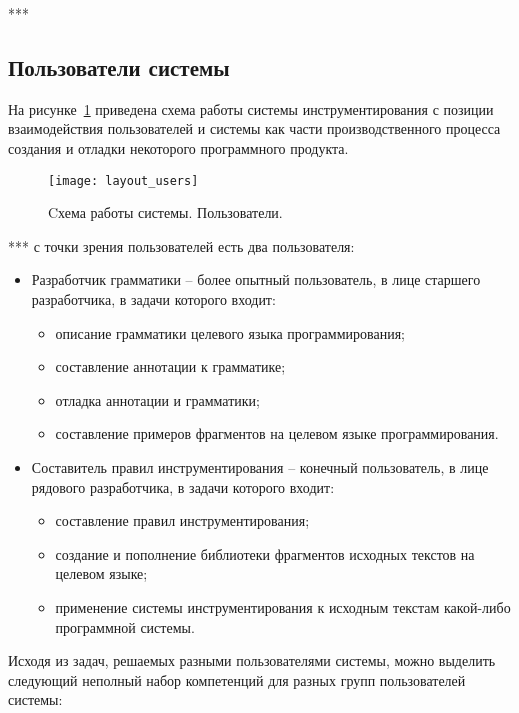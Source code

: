 ***

\subsection{Пользователи системы}

На рисунке~\ref{fig:layout_users} приведена схема работы системы инструментирования с позиции взаимодействия пользователей и системы как части производственного процесса создания и отладки некоторого программного продукта.

\begin{figure}[h]
	\centering
	\texttt{[image: layout\_users]}
	\caption{Cхема работы системы. Пользователи.}
	\label{fig:layout_users}
\end{figure}

***
с точки зрения пользователей есть два пользователя:

\begin{itemize}[noitemsep]
  \item Разработчик грамматики -- более опытный пользователь, в лице старшего разработчика, в задачи которого входит:
    \begin{itemize}[noitemsep]
      \item описание грамматики целевого языка программирования;
      \item составление аннотации к грамматике;
      \item отладка аннотации и грамматики;
      \item составление примеров фрагментов на целевом языке программирования.
    \end{itemize}

  \item Составитель правил инструментирования -- конечный пользователь, в лице рядового разработчика, в задачи которого входит:
    \begin{itemize}[noitemsep]
      \item составление правил инструментирования;
      \item создание и пополнение библиотеки фрагментов исходных текстов на целевом языке;
      \item применение системы инструментирования к исходным текстам какой-либо программной системы.
    \end{itemize}
\end{itemize}

Исходя из задач, решаемых разными пользователями системы, можно выделить следующий неполный набор компетенций для разных групп пользователей системы:

